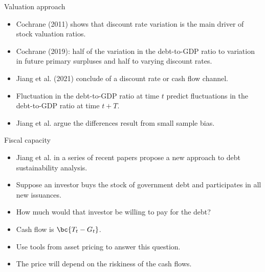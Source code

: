 \documentclass[11pt,xcolor={dvipsnames},aspectratio=159,hyperref={pdftex,pdfpagemode=UseNone,hidelinks,pdfdisplaydoctitle=true},usepdftitle=false]{beamer}
\begin{document}
\begin{frame}{Valuation approach}
    \begin{itemize}
        \item Cochrane (2011) shows that discount rate variation is
        the main driver of stock valuation ratios.
        \item Cochrane (2019): half of the variation in the debt-to-GDP ratio to variation in future primary surpluses and half to varying discount rates.
        \item Jiang et al. (2021) conclude  of a discount rate or cash flow channel. 
        \item Fluctuation in the debt-to-GDP ratio at time $t$ predict fluctuations in the debt-to-GDP ratio at time $t+T$.
        \item Jiang et al. argue the differences result from small sample bias. 
    \end{itemize}
\end{frame}

\begin{frame}{Fiscal capacity}
    \begin{itemize}
        \item Jiang et al. in a series of recent papers propose a new approach to debt sustainability analysis.
        \item Suppose an investor buys the  stock of government debt and participates in all new issuances. 
        \item How much would that investor be willing to pay for the debt?
        \item Cash flow is $\bc{T_t-G_t}$.
        \item Use tools from asset pricing to answer this question.
        \item The price will depend on the riskiness of the cash flows. 
    \end{itemize}
\end{frame}

\begin{frame}
\end{frame}
\end{document}
